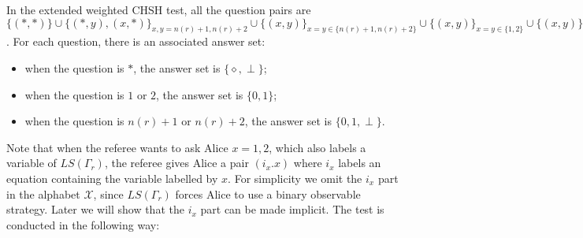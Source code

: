 \documentclass[11pt,letterpaper]{article}
\newcommand{\calX}{\mathcal{X}}
\newcommand{\calY}{\mathcal{Y}}
\newcommand{\1}{\mathbb{1}}
\newcommand{\LS}{LS}
\newcommand{\nr}{n(r)}
\theoremstyle{definition}
\begin{document}
In the extended weighted CHSH test,
all the question pairs are $\{ (\ast, \ast) \} \cup \{(\ast, y), (x, \ast)\}_{x,y = \nr+1, \nr+2} \cup 
\{(x,y)\}_{x=y \in \{\nr+1, \nr+2\}} \cup
\{(x,y)\}_{x = y \in \{1, 2\}} \cup \{(x,y)\}_{x = 1,2, y =\nr+1, \nr+2} \cup  \{(x,y)\}_{x = \nr+1,\nr+2, y =1, 2}$.
For each question, there is an associated answer set:
\begin{itemize}
	\item when the question is $\ast$, the answer set is $\{\diamond, \perp\}$;
	\item when the question is $1$ or $2$, the answer set is $\{0,1\}$;
	\item when the question is $\nr+1$ or $\nr+2$, the answer set is $\{0, 1, \perp\}$.
\end{itemize}
Note that when the referee wants to ask Alice $x = 1,2$, which also labels a variable of $\LS(\Gamma_r)$, 
the referee gives Alice a pair $(i_x. x)$ where 
$i_x$ labels an equation containing the variable labelled by $x$. 
For simplicity we omit the $i_x$ part in the alphabet $\calX$, since $\LS(\Gamma_r)$
forces Alice to use a binary observable strategy.
Later we will show that the $i_x$ part can be made implicit.
The test is conducted in the following way:
\end{document}
